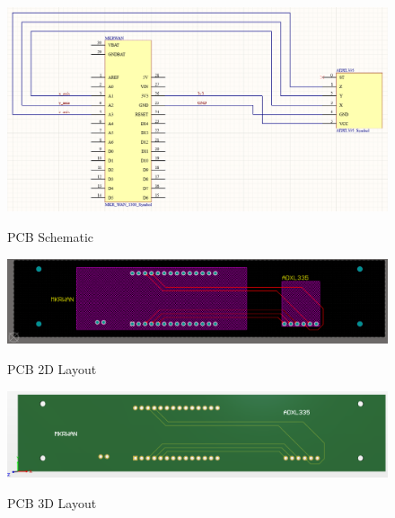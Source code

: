 \begin{figure}[H]
	\centering
	\caption{PCB Schematic}	
	\includegraphics[width=\textwidth]{Sections/Design-Process/PCB-schematic.png}
	\label{PCB-schematic}
\end{figure}

\begin{figure}[H]
	\centering
	\caption{PCB 2D Layout}	
	\includegraphics[width=\textwidth]{Sections/Design-Process/PCB-2D.png}
	\label{PCB-2D}
\end{figure}

\begin{figure}[H]
	\centering
	\caption{PCB 3D Layout}	
	\includegraphics[width=\textwidth]{Sections/Design-Process/PCB-3D.png}
	\label{PCB-3D}
\end{figure}

\clearpage

